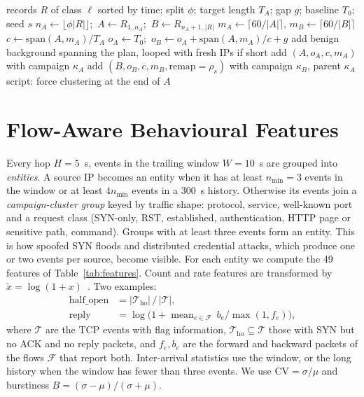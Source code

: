\documentclass[conference]{IEEEtran}
\begin{document}
\begin{algorithm}[t]
\caption{Returning-attacker plan}\label{alg:returning}
\small
\begin{algorithmic}[1]
\Require records $R$ of class $\ell$ sorted by time; split $\phi$; target length $T_A$; gap $g$; baseline $T_0$; seed $s$
\State $n_A\gets\lfloor\phi|R|\rfloor$;\ $A\gets R_{1..n_A}$;\ $B\gets R_{n_A+1..|R|}$
\State $m_A\gets\lceil 60/|A|\rceil$, $m_B\gets\lceil 60/|B|\rceil$ 
\State $c\gets \mathrm{span}(A, m_A)/T_A$ 
\State $o_A\gets T_0$;\ $o_B\gets o_A+\mathrm{span}(A,m_A)/c+g$
\State add benign background spanning the plan, looped with fresh IPs if short
\State add $(A, o_A, c, m_A)$ with campaign $\kappa_A$
\State add $(B, o_B, c, m_B, \text{remap}=\rho_s)$ with campaign $\kappa_B$, parent $\kappa_A$
\State script: force clustering at the end of $A$
\end{algorithmic}
\end{algorithm}

\section{Flow-Aware Behavioural Features}\label{sec:features}
Every hop $H=5$~s, events in the trailing window $W=10$~s are grouped into \emph{entities}. A source IP becomes an entity when it has at least $n_{\min}=3$ events in the window or at least $4n_{\min}$ events in a 300~s history. Otherwise its events join a \emph{campaign-cluster group} keyed by traffic shape: protocol, service, well-known port and a request class (SYN-only, RST, established, authentication, HTTP page or sensitive path, command). Groups with at least three events form an entity. This is how spoofed SYN floods and distributed credential attacks, which produce one or two events per source, become visible. For each entity we compute the 49 features of Table~\ref{tab:features}. Count and rate features are transformed by $\tilde x=\log(1+x)$~\cite{savage2025}. Two examples:
\begin{align}
\mathrm{half\_open}&=|\mathcal T_{\mathrm{ho}}|\,/\,|\mathcal T|,\\
\mathrm{reply}&=\log\big(1+\operatorname{mean}_{e\in\mathcal F}\, b_e/\max(1,f_e)\big),
\end{align}
where $\mathcal T$ are the TCP events with flag information, $\mathcal T_{\mathrm{ho}}\subseteq\mathcal T$ those with SYN but no ACK and no reply packets, and $f_e,b_e$ are the forward and backward packets of the flows $\mathcal F$ that report both. Inter-arrival statistics use the window, or the long history when the window has fewer than three events. We use $\mathrm{CV}=\sigma/\mu$ and burstiness $B=(\sigma-\mu)/(\sigma+\mu)$.
\end{document}
